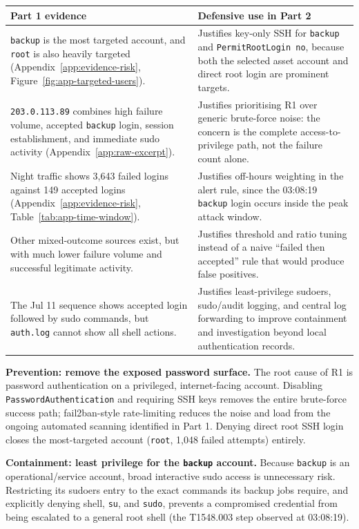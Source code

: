 \documentclass[10pt,a4paper]{article}
\begin{document}
\begin{center}
\scriptsize
\begin{tabularx}{\linewidth}{L{4.55cm}Y}
\toprule
Part 1 evidence & Defensive use in Part 2 \\
\midrule
\texttt{backup} is the most targeted account, and \texttt{root} is also heavily targeted (Appendix~\ref{app:evidence-risk}, Figure~\ref{fig:app-targeted-users}). & Justifies key-only SSH for \texttt{backup} and \texttt{PermitRootLogin no}, because both the selected asset account and direct root login are prominent targets. \\
\texttt{203.0.113.89} combines high failure volume, accepted \texttt{backup} login, session establishment, and immediate sudo activity (Appendix~\ref{app:raw-excerpt}). & Justifies prioritising R1 over generic brute-force noise: the concern is the complete access-to-privilege path, not the failure count alone. \\
Night traffic shows 3,643 failed logins against 149 accepted logins (Appendix~\ref{app:evidence-risk}, Table~\ref{tab:app-time-window}). & Justifies off-hours weighting in the alert rule, since the 03:08:19 \texttt{backup} login occurs inside the peak attack window. \\
Other mixed-outcome sources exist, but with much lower failure volume and successful legitimate activity. & Justifies threshold and ratio tuning instead of a naive ``failed then accepted'' rule that would produce false positives. \\
The Jul 11 sequence shows accepted login followed by sudo commands, but \texttt{auth.log} cannot show all shell actions. & Justifies least-privilege sudoers, sudo/audit logging, and central log forwarding to improve containment and investigation beyond local authentication records. \\
\bottomrule
\end{tabularx}
\end{center}

\textbf{Prevention: remove the exposed password surface.} The root cause of R1 is password authentication on a privileged, internet-facing account. Disabling \texttt{PasswordAuthentication} and requiring SSH keys removes the entire brute-force success path; fail2ban-style rate-limiting reduces the noise and load from the ongoing automated scanning identified in Part 1. Denying direct root SSH login closes the most-targeted account (\texttt{root}, 1,048 failed attempts) entirely.

\textbf{Containment: least privilege for the \texttt{backup} account.} Because \texttt{backup} is an operational/service account, broad interactive sudo access is unnecessary risk. Restricting its sudoers entry to the exact commands its backup jobs require, and explicitly denying shell, \texttt{su}, and \texttt{sudo}, prevents a compromised credential from being escalated to a general root shell (the T1548.003 step observed at 03:08:19).
\end{document}
